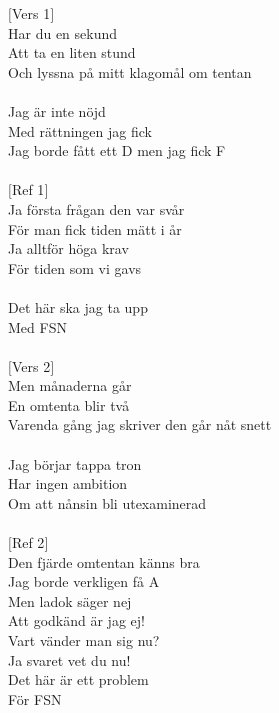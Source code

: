 \documentclass[a6paper, 10pt, twoside]{article}
\begin{document}
\begin{center}
\end{center}
\begin{lyrics}
$[$Vers 1$]$\\
Har du en sekund\\
Att ta en liten stund\\
Och lyssna på mitt klagomål om tentan\\
\vspace{5pt}\\
Jag är inte nöjd\\
Med rättningen jag fick\\
Jag borde fått ett D men jag fick F\\
\vspace{5pt}\\
$[$Ref 1$]$\\
Ja första frågan den var svår\\
För man fick tiden mätt i år\\
Ja alltför höga krav\\
För tiden som vi gavs\\
\vspace{5pt}\\
Det här ska jag ta upp\\
Med FSN\\
\vspace{5pt}\\
$[$Vers 2$]$\\
Men månaderna går\\
En omtenta blir två\\
Varenda gång jag skriver den går nåt snett\\
\vspace{5pt}\\
Jag börjar tappa tron\\
Har ingen ambition\\
Om att nånsin bli utexaminerad\\
\vspace{5pt}\\
$[$Ref 2$]$\\
Den fjärde omtentan känns bra\\
Jag borde verkligen få A\\
Men ladok säger nej\\
Att godkänd är jag ej!\\
Vart vänder man sig nu?\\
Ja svaret vet du nu! \\
Det här är ett problem\\
För FSN\\
\end{lyrics}
\end{document}
